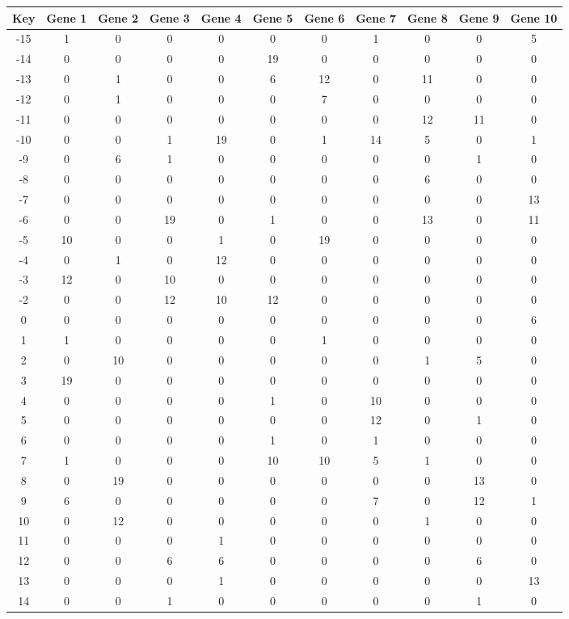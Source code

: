 \begin{tabular}{|c|c|c|c|c|c|c|c|c|c|c|}
\hline
Key & Gene 1 & Gene 2 & Gene 3 & Gene 4 & Gene 5 & Gene 6 & Gene 7 & Gene 8 & Gene 9 & Gene 10 \\
\hline
-15 & 1 & 0 & 0 & 0 & 0 & 0 & 1 & 0 & 0 & 5 \\
-14 & 0 & 0 & 0 & 0 & 19 & 0 & 0 & 0 & 0 & 0 \\
-13 & 0 & 1 & 0 & 0 & 6 & 12 & 0 & 11 & 0 & 0 \\
-12 & 0 & 1 & 0 & 0 & 0 & 7 & 0 & 0 & 0 & 0 \\
-11 & 0 & 0 & 0 & 0 & 0 & 0 & 0 & 12 & 11 & 0 \\
-10 & 0 & 0 & 1 & 19 & 0 & 1 & 14 & 5 & 0 & 1 \\
-9 & 0 & 6 & 1 & 0 & 0 & 0 & 0 & 0 & 1 & 0 \\
-8 & 0 & 0 & 0 & 0 & 0 & 0 & 0 & 6 & 0 & 0 \\
-7 & 0 & 0 & 0 & 0 & 0 & 0 & 0 & 0 & 0 & 13 \\
-6 & 0 & 0 & 19 & 0 & 1 & 0 & 0 & 13 & 0 & 11 \\
-5 & 10 & 0 & 0 & 1 & 0 & 19 & 0 & 0 & 0 & 0 \\
-4 & 0 & 1 & 0 & 12 & 0 & 0 & 0 & 0 & 0 & 0 \\
-3 & 12 & 0 & 10 & 0 & 0 & 0 & 0 & 0 & 0 & 0 \\
-2 & 0 & 0 & 12 & 10 & 12 & 0 & 0 & 0 & 0 & 0 \\
0 & 0 & 0 & 0 & 0 & 0 & 0 & 0 & 0 & 0 & 6 \\
1 & 1 & 0 & 0 & 0 & 0 & 1 & 0 & 0 & 0 & 0 \\
2 & 0 & 10 & 0 & 0 & 0 & 0 & 0 & 1 & 5 & 0 \\
3 & 19 & 0 & 0 & 0 & 0 & 0 & 0 & 0 & 0 & 0 \\
4 & 0 & 0 & 0 & 0 & 1 & 0 & 10 & 0 & 0 & 0 \\
5 & 0 & 0 & 0 & 0 & 0 & 0 & 12 & 0 & 1 & 0 \\
6 & 0 & 0 & 0 & 0 & 1 & 0 & 1 & 0 & 0 & 0 \\
7 & 1 & 0 & 0 & 0 & 10 & 10 & 5 & 1 & 0 & 0 \\
8 & 0 & 19 & 0 & 0 & 0 & 0 & 0 & 0 & 13 & 0 \\
9 & 6 & 0 & 0 & 0 & 0 & 0 & 7 & 0 & 12 & 1 \\
10 & 0 & 12 & 0 & 0 & 0 & 0 & 0 & 1 & 0 & 0 \\
11 & 0 & 0 & 0 & 1 & 0 & 0 & 0 & 0 & 0 & 0 \\
12 & 0 & 0 & 6 & 6 & 0 & 0 & 0 & 0 & 6 & 0 \\
13 & 0 & 0 & 0 & 1 & 0 & 0 & 0 & 0 & 0 & 13 \\
14 & 0 & 0 & 1 & 0 & 0 & 0 & 0 & 0 & 1 & 0 \\
\hline
\end{tabular}